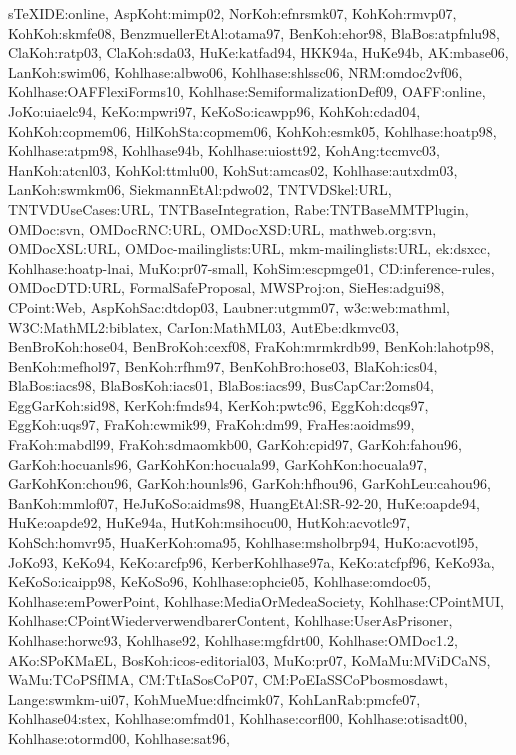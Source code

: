 {sTeXIDE:online,%
AspKoht:mimp02,%
NorKoh:efnrsmk07,%
KohKoh:rmvp07,%
KohKoh:skmfe08,%
BenzmuellerEtAl:otama97,%
BenKoh:ehor98,%
BlaBos:atpfnlu98,%
ClaKoh:ratp03,%
ClaKoh:sda03,%
HuKe:katfad94,%
HKK94a,%
HuKe94b,%
AK:mbase06,%
LanKoh:swim06,%
Kohlhase:albwo06,%
Kohlhase:shlssc06,%
NRM:omdoc2vf06,%
Kohlhase:OAFFlexiForms10,%
Kohlhase:SemiformalizationDef09,%
OAFF:online,%
JoKo:uiaelc94,%
KeKo:mpwri97,%
KeKoSo:icawpp96,%
KohKoh:cdad04,%
KohKoh:copmem06,%
HilKohSta:copmem06,%
KohKoh:esmk05,%
Kohlhase:hoatp98,%
Kohlhase:atpm98,%
Kohlhase94b,%
Kohlhase:uiostt92,%
KohAng:tccmvc03,%
HanKoh:atcnl03,%
KohKol:ttmlu00,%
KohSut:amcas02,%
Kohlhase:autxdm03,%
LanKoh:swmkm06,%
SiekmannEtAl:pdwo02,%
TNTVDSkel:URL,%
TNTVDUseCases:URL,%
TNTBaseIntegration,%
Rabe:TNTBaseMMTPlugin,%
OMDoc:svn,%
OMDocRNC:URL,%
OMDocXSD:URL,%
mathweb.org:svn,%
OMDocXSL:URL,%
OMDoc-mailinglists:URL,%
mkm-mailinglists:URL,%
ek:dsxcc,%
Kohlhase:hoatp-lnai,%
MuKo:pr07-small,%
KohSim:escpmge01,%
CD:inference-rules,%
OMDocDTD:URL,%
FormalSafeProposal,%
MWSProj:on,%
SieHes:adgui98,%
CPoint:Web,%
AspKohSac:dtdop03,%
Laubner:utgmm07,%
w3c:web:mathml,%
W3C:MathML2:biblatex,%
CarIon:MathML03,%
AutEbe:dkmvc03,%
BenBroKoh:hose04,%
BenBroKoh:cexf08,%
FraKoh:mrmkrdb99,%
BenKoh:lahotp98,%
BenKoh:mefhol97,%
BenKoh:rfhm97,%
BenKohBro:hose03,%
BlaKoh:ics04,%
BlaBos:iacs98,%
BlaBosKoh:iacs01,%
BlaBos:iacs99,%
BusCapCar:2oms04,%
EggGarKoh:sid98,%
KerKoh:fmds94,%
KerKoh:pwtc96,%
EggKoh:dcqs97,%
EggKoh:uqs97,%
FraKoh:cwmik99,%
FraKoh:dm99,%
FraHes:aoidms99,%
FraKoh:mabdl99,%
FraKoh:sdmaomkb00,%
GarKoh:cpid97,%
GarKoh:fahou96,%
GarKoh:hocuanls96,%
GarKohKon:hocuala99,%
GarKohKon:hocuala97,%
GarKohKon:chou96,%
GarKoh:hounls96,%
GarKoh:hfhou96,%
GarKohLeu:cahou96,%
BanKoh:mmlof07,%
HeJuKoSo:aidms98,%
HuangEtAl:SR-92-20,%
HuKe:oapde94,%
HuKe:oapde92,%
HuKe94a,%
HutKoh:msihocu00,%
HutKoh:acvotlc97,%
KohSch:homvr95,%
HuaKerKoh:oma95,%
Kohlhase:msholbrp94,%
HuKo:acvotl95,%
JoKo93,%
KeKo94,%
KeKo:arcfp96,%
KerberKohlhase97a,%
KeKo:atcfpf96,%
KeKo93a,%
KeKoSo:icaipp98,%
KeKoSo96,%
Kohlhase:ophcie05,%
Kohlhase:omdoc05,%
Kohlhase:emPowerPoint,%
Kohlhase:MediaOrMedeaSociety,%
Kohlhase:CPointMUI,%
Kohlhase:CPointWiederverwendbarerContent,%
Kohlhase:UserAsPrisoner,%
Kohlhase:horwc93,%
Kohlhase92,%
Kohlhase:mgfdrt00,%
Kohlhase:OMDoc1.2,%
AKo:SPoKMaEL,%
BosKoh:icos-editorial03,%
MuKo:pr07,%
KoMaMu:MViDCaNS,%
WaMu:TCoPSfIMA,%
CM:TtIaSosCoP07,%
CM:PoEIaSSCoPbosmosdawt,%
Lange:swmkm-ui07,%
KohMueMue:dfncimk07,%
KohLanRab:pmcfe07,%
Kohlhase04:stex,%
Kohlhase:omfmd01,%
Kohlhase:corfl00,%
Kohlhase:otisadt00,%
Kohlhase:otormd00,%
Kohlhase:sat96,%
}
